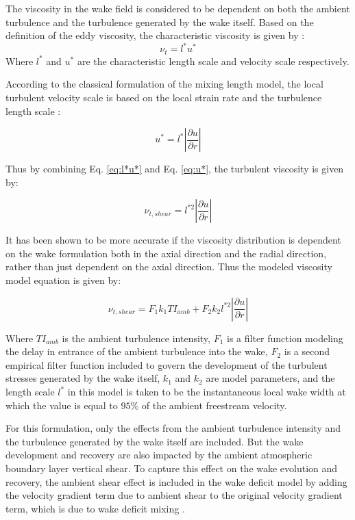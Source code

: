 \documentclass{umthesis}
\begin{document}
The viscosity in the wake field is considered to be dependent on both the ambient turbulence and the turbulence generated by the wake itself. Based on the definition of the eddy viscosity, the characteristic viscosity is given by \cite{Pope}:
\begin{equation}\label{eq:l*u*}
  \nu_t=l^*u^*
\end{equation}
Where $l^*$ and $u^*$ are the characteristic length scale and velocity scale respectively.

According to the classical formulation of the mixing length model, the local turbulent velocity scale is based on the local strain rate and the turbulence length scale \cite{Pope}:

\begin{equation}\label{eq:u*}
  u^*=l^*|\frac{\partial u}{\partial r}|
\end{equation}

Thus by combining Eq. \ref{eq:l*u*} and Eq. \ref{eq:u*}, the turbulent viscosity is given by:

\begin{equation}
  \nu_{t,shear}=l^{*2}|\frac{\partial u}{\partial r}|
\end{equation}

It has been shown to be more accurate if the viscosity distribution is dependent on the wake formulation both in the axial direction and the radial direction, rather than just dependent on the axial direction. Thus the modeled viscosity model equation is given by:

\begin{equation}
  \nu_{t,shear}=F_1k_1TI_{amb}+F_2k_2l^{*2}|\frac{\partial u}{\partial r}|
\end{equation}

Where $TI_{amb}$ is the ambient turbulence intensity, $F_1$ is a filter function modeling the delay in entrance of the ambient turbulence into the wake, $F_2$ is a second empirical filter function included to govern the development of the turbulent stresses generated by the wake itself, $k_1$ and $k_2$ are model parameters, and the length scale $l^*$ in this model is taken to be the instantaneous local wake width at which the value is equal to $95\%$ of the ambient freestream velocity.

For this formulation, only the effects from the ambient turbulence intensity and the turbulence generated by the wake itself are included. But the wake development and recovery are also impacted by the ambient atmospheric boundary layer vertical shear. To capture this effect on the wake evolution and recovery, the ambient shear effect is included in the wake deficit model by adding the velocity gradient term due to ambient shear to the original velocity gradient term, which is due to wake deficit mixing \cite{Keck_two}.
\end{document}

